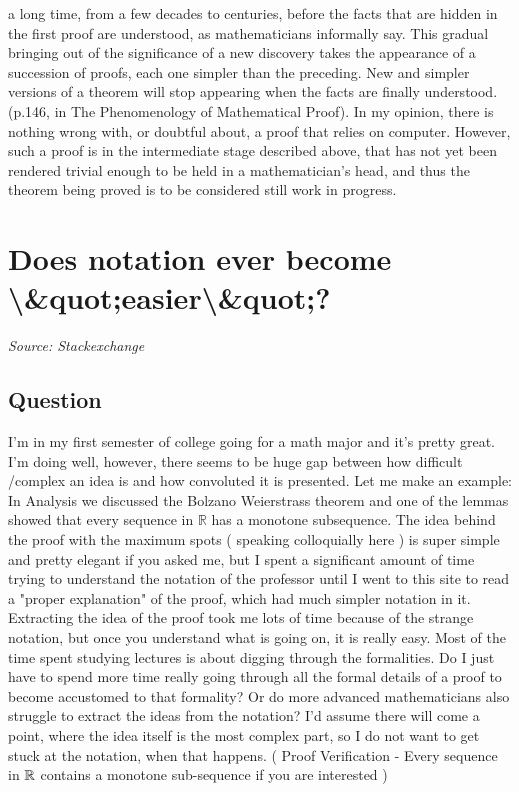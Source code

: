 \documentclass{article}
\begin{document}
a long time, from a few decades to centuries, before the facts that are hidden in the first proof are understood, as mathematicians informally say. This gradual bringing out of the significance of a new discovery takes the appearance of a succession of proofs, each one simpler than the preceding. New and simpler versions of a theorem will stop appearing when the facts are finally understood. (p.146, in The Phenomenology of Mathematical Proof). In my opinion, there is nothing wrong with, or doubtful about, a proof that relies on computer. However, such a proof is in the intermediate stage described above, that has not yet been rendered trivial enough to be held in a mathematician's head, and thus the theorem being proved is to be considered still work in progress.

\newpage

\section{Does notation ever become \textbackslash{}&quot;easier\textbackslash{}&quot;?}
\textit{Source: Stackexchange}

\subsection*{Question}
I'm in my first semester of college going for a math major and it's pretty great. I'm doing well, however, there seems to be huge gap between how difficult /complex an idea is and how convoluted it is presented. Let me make an example: In Analysis we discussed the Bolzano Weierstrass theorem and one of the lemmas showed that every sequence in $\mathbb{R}$ has a monotone subsequence. The idea behind the proof with the maximum spots ( speaking colloquially here ) is super simple and pretty elegant if you asked me, but I spent a significant amount of time trying to understand the notation of the professor until I went to this site to read a "proper explanation" of the proof, which had much simpler notation in it. Extracting the idea of the proof took me lots of time because of the strange notation, but once you understand what is going on, it is really easy. Most of the time spent studying lectures is about digging through the formalities. Do I just have to spend more time really going through all the formal details of a proof to become accustomed to that formality? Or do more advanced mathematicians also struggle to extract the ideas from the notation? I'd assume there will come a point, where the idea itself is the most complex part, so I do not want to get stuck at the notation, when that happens. ( Proof Verification - Every sequence in $\Bbb R$ contains a monotone sub-sequence if you are interested )
\end{document}
